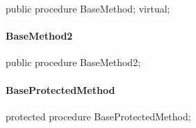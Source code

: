 \documentclass{report}
\newif\ifpdf
\begin{document}
\label{ok_inherited_members.TBase-BaseMethod}
\begin{list}{}{
\setlength{\itemindent}{0cm}
\setlength{\listparindent}{0cm}
\setlength{\leftmargin}{\evensidemargin}
\addtolength{\leftmargin}{\tmplength}
\settowidth{\labelsep}{X}
\addtolength{\leftmargin}{\labelsep}
\setlength{\labelwidth}{\tmplength}
}
\item[\textbf{Declaration}\hfill]
\ifpdf
\begin{flushleft}
\fi
\begin{ttfamily}
public procedure BaseMethod; virtual;\end{ttfamily}

\ifpdf
\end{flushleft}
\fi

\end{list}
\paragraph*{BaseMethod2}\hspace*{\fill}

\label{ok_inherited_members.TBase-BaseMethod2}
\begin{list}{}{
\setlength{\itemindent}{0cm}
\setlength{\listparindent}{0cm}
\setlength{\leftmargin}{\evensidemargin}
\addtolength{\leftmargin}{\tmplength}
\settowidth{\labelsep}{X}
\addtolength{\leftmargin}{\labelsep}
\setlength{\labelwidth}{\tmplength}
}
\item[\textbf{Declaration}\hfill]
\ifpdf
\begin{flushleft}
\fi
\begin{ttfamily}
public procedure BaseMethod2;\end{ttfamily}

\ifpdf
\end{flushleft}
\fi

\end{list}
\paragraph*{BaseProtectedMethod}\hspace*{\fill}

\label{ok_inherited_members.TBase-BaseProtectedMethod}
\begin{list}{}{
\setlength{\itemindent}{0cm}
\setlength{\listparindent}{0cm}
\setlength{\leftmargin}{\evensidemargin}
\addtolength{\leftmargin}{\tmplength}
\settowidth{\labelsep}{X}
\addtolength{\leftmargin}{\labelsep}
\setlength{\labelwidth}{\tmplength}
}
\item[\textbf{Declaration}\hfill]
\ifpdf
\begin{flushleft}
\fi
\begin{ttfamily}
protected procedure BaseProtectedMethod;\end{ttfamily}

\ifpdf
\end{flushleft}
\fi

\end{list}
\ifpdf
\end{document}
